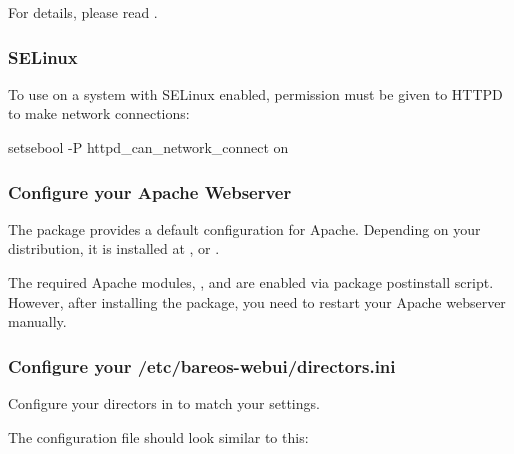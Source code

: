 For details, please read .

\subsubsection{SELinux}
\label{sec:webui-selinux}

To use \bareosDir on a system with SELinux enabled,
permission must be given to HTTPD to make network connections:
\begin{commands}{}
setsebool -P httpd_can_network_connect on
\end{commands}


\subsubsection{Configure your Apache Webserver}
\label{sec:webui-apache}

The package  provides a default configuration for Apache.
Depending on your distribution, it is installed at ,  or .

The required Apache modules, ,  and  are enabled via package postinstall script.
However, after installing the  package, you need to restart your Apache webserver manually.

\subsubsection{Configure your /etc/bareos-webui/directors.ini}
\label{sec:webui-configuration-files}

Configure your directors in  to match your settings.

The configuration file  should look similar to this:

